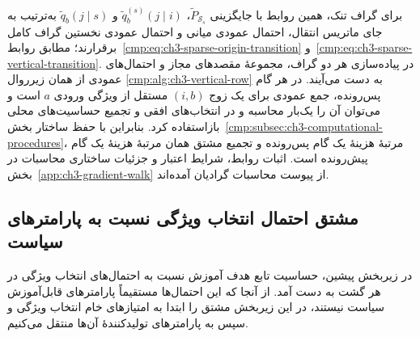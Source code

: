 برای گراف تنک، همین روابط با جایگزینی
$\widetilde P_{\mathcal S_s}$،
$\widetilde q_b^{(s)}(j\mid i)$ و
$\widetilde q_b(j\mid s)$ به‌ترتیب به جای
ماتریس انتقال، احتمال عمودی میانی و احتمال
عمودی نخستین گراف کامل برقرارند؛ مطابق
روابط~\eqref{cmp:eq:ch3-sparse-origin-transition}
و~\eqref{cmp:eq:ch3-sparse-vertical-transition}.
در پیاده‌سازی هر دو گراف، مجموعهٔ مقصدهای مجاز
و احتمال‌های عمودی از همان زیرروال
\ref{cmp:alg:ch3-vertical-row} به دست می‌آیند.
در هر گام پس‌رونده، جمع عمودی برای یک زوج
$(i,b)$ مستقل از ویژگی ورودی $a$ است و می‌توان
آن را یک‌بار محاسبه و در انتخاب‌های افقی و
تجمیع حساسیت‌های محلی بازاستفاده کرد.
بنابراین با حفظ ساختار بخش~\ref{cmp:subsec:ch3-computational-procedures}،
مرتبهٔ هزینهٔ یک گام پس‌رونده و تجمیع مشتق
همان مرتبهٔ هزینهٔ یک گام پیش‌رونده است.
اثبات روابط، شرایط اعتبار و جزئیات ساختاری
محاسبات در بخش~\ref{app:ch3-gradient-walk}
از پیوست محاسبات گرادیان آمده‌اند.

\subsection{مشتق احتمال انتخاب ویژگی نسبت به پارامترهای سیاست}
\label{cmp:subsec:ch3-gradient-policy-parameters}

در زیربخش پیشین، حساسیت تابع هدف آموزش
نسبت به احتمال‌های انتخاب ویژگی در هر گشت
به دست آمد. از آنجا که این احتمال‌ها مستقیماً
پارامترهای قابل‌آموزش سیاست نیستند، در این
زیربخش مشتق را ابتدا به امتیازهای خام انتخاب
ویژگی و سپس به پارامترهای تولیدکنندهٔ آن‌ها
منتقل می‌کنیم.

